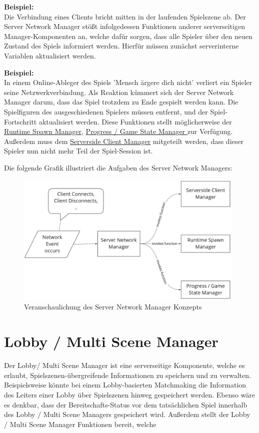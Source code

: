 \textbf{Beispiel:} \\
Die Verbindung eines Clients bricht mitten in der laufenden Spielszene ab. Der Server Network Manager stößt infolgedessen Funktionen anderer serverseitigen Manager-Komponenten an, welche dafür sorgen, dass alle Spieler über den neuen Zustand des Spiels informiert werden. Hierfür müssen zunächst serverinterne Variablen aktualisiert werden.

\textbf{Beispiel:}  \\
In einem Online-Ableger des Spiels 'Mensch ärgere dich nicht' verliert ein Spieler seine Netzwerkverbindung. Als Reaktion kümmert sich der Server Network Manager darum, dass das Spiel trotzdem zu Ende gespielt werden kann. Die Spielfiguren des ausgeschiedenen Spielers müssen entfernt, und der Spiel-Fortschritt aktualisiert werden. Diese Funktionen stellt möglicherweise der \hyperref[spawn_manager]{Runtime Spawn Manager}, \hyperref[progress_manager]{Progress / Game State Manager } zur Verfügung.
Außerdem muss dem \hyperref[serverside_client_manager]{Serverside Client Manager} mitgeteilt werden, dass dieser Spieler nun nicht mehr Teil der Spiel-Session ist.

Die folgende Grafik illustriert die Aufgaben des Server Network Managers:

\begin{figure}[H]
	\centering
	\includegraphics[width=110mm]{images/Server_Network_Manager.jpg}
	\caption[Server Network Manager Diagramm]{Veranschaulichung des Server Network Manager Konzepts}
	\label{pic:Server_Network_Manager}
\end{figure}

\section{Lobby / Multi Scene Manager}

Der Lobby/ Multi Scene Manager ist eine serverseitige Komponente, welche es erlaubt, Spielszenen-übergreifende Informationen zu speichern und zu verwalten. Beispielsweise könnte bei einem Lobby-basierten Matchmaking die Information des Leiters einer Lobby über Spielszenen hinweg gespeichert werden. Ebenso wäre es denkbar, dass der Bereitschafts-Status vor dem tatsächlichen Spiel innerhalb des Lobby / Multi Scene Managers gespeichert wird. Außerdem stellt der Lobby / Multi Scene Manager Funktionen bereit, welche

